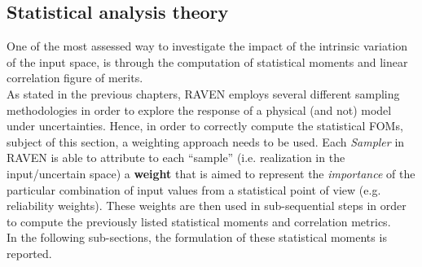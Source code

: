 \subsection{Statistical analysis theory}
One of the most assessed way to investigate the impact of the intrinsic variation of the input space, is through the computation of 
statistical moments and linear correlation figure of merits. 
\\As stated in the previous chapters, RAVEN employs several different sampling methodologies in order to explore
the response of a physical (and not) model under uncertainties. Hence, in order to correctly compute the statistical FOMs, subject
of this section, a weighting approach needs to be used. Each \textit{Sampler} in RAVEN is able to attribute to each ``sample'' (i.e.
realization in the input/uncertain space) a \textbf{weight} that is aimed to represent the \textit{importance} of the particular
combination of input values from a statistical point of view (e.g. reliability weights). These weights are then used in sub-sequential
steps in order to compute the previously listed statistical moments and correlation metrics.
\\In the following sub-sections, the formulation of these statistical moments is reported.

